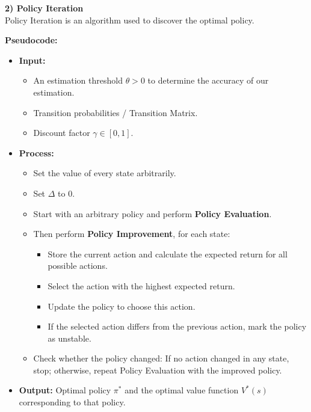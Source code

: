 \vspace{0.5cm}

\textbf{\textcolor{primary}{2) Policy Iteration}} \\
Policy Iteration is an algorithm used to discover the optimal policy.

\textbf{Pseudocode:}
\begin{itemize}
    \item \textbf{Input:}
    \begin{itemize}
        \item An estimation threshold $\theta > 0$ to determine the accuracy of our estimation.
        \item Transition probabilities / Transition Matrix.
        \item Discount factor $\gamma \in [0,1]$.
    \end{itemize}
    \item \textbf{Process:}
    \begin{itemize}
        \item Set the value of every state arbitrarily.
        \item Set $\Delta$ to 0.
        \item Start with an arbitrary policy and perform \textbf{Policy Evaluation}.
        \item Then perform \textbf{Policy Improvement}, for each state:
        \begin{itemize}
            \item Store the current action and calculate the expected return for all possible actions.
            \item Select the action with the highest expected return.
            \item Update the policy to choose this action.
            \item If the selected action differs from the previous action, mark the policy as unstable.
        \end{itemize}
        \item Check whether the policy changed: If no action changed in any state, stop; otherwise, repeat Policy Evaluation with the improved policy.
    \end{itemize}
    \item \textbf{Output:} Optimal policy $\pi^*$ and the optimal value function $V^*(s)$ corresponding to that policy.
\end{itemize}

\vspace{0.5cm}

